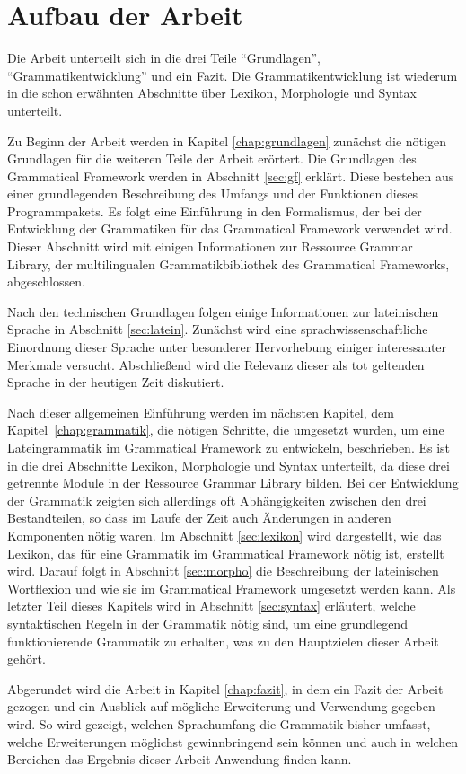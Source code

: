 \section{Aufbau der Arbeit}
\label{sec:aufbau}
Die Arbeit unterteilt sich in die drei Teile "`Grundlagen"', "`Grammatikentwicklung"' und ein Fazit. Die Grammatikentwicklung ist wiederum in die schon erwähnten Abschnitte über Lexikon, Morphologie und Syntax unterteilt. \par
Zu Beginn der Arbeit werden in Kapitel \ref{chap:grundlagen} zunächst die nötigen Grundlagen für die weiteren Teile der Arbeit erörtert. Die Grundlagen des Grammatical Framework werden in Abschnitt \ref{sec:gf} erklärt. Diese bestehen aus einer grundlegenden Beschreibung des Umfangs und der Funktionen dieses Programmpakets. Es folgt eine Einführung in den Formalismus, der bei der Entwicklung der Grammatiken für das Grammatical Framework verwendet wird. Dieser Abschnitt wird mit einigen Informationen zur Ressource Grammar Library, der multilingualen Grammatikbibliothek des Grammatical Frameworks, abgeschlossen. \par
Nach den technischen Grundlagen folgen einige Informationen zur lateinischen Sprache in Abschnitt \ref{sec:latein}. Zunächst wird eine sprachwissenschaftliche Einordnung dieser Sprache unter besonderer Hervorhebung einiger interessanter Merkmale versucht. Abschließend wird die Relevanz dieser als tot geltenden Sprache in der heutigen Zeit diskutiert. \par
Nach dieser allgemeinen Einführung werden im nächsten Kapitel, dem \mbox{Kapitel \ref{chap:grammatik}}, die nötigen Schritte, die umgesetzt wurden, um eine Lateingrammatik im Grammatical Framework zu entwickeln, beschrieben. Es ist in die drei Abschnitte Lexikon, Morphologie und Syntax unterteilt, da diese drei getrennte Module in der Ressource Grammar Library bilden. Bei der Entwicklung der Grammatik zeigten sich allerdings oft Abhängigkeiten zwischen den drei Bestandteilen, so dass im Laufe der Zeit auch Änderungen in anderen Komponenten nötig waren. Im Abschnitt \ref{sec:lexikon} wird dargestellt, wie das Lexikon, das für eine Grammatik im Grammatical Framework nötig ist, erstellt wird. Darauf folgt in Abschnitt \ref{sec:morpho} die Beschreibung der lateinischen Wortflexion und wie sie im Grammatical Framework umgesetzt werden kann. Als letzter Teil dieses Kapitels wird in Abschnitt \ref{sec:syntax} erläutert, welche syntaktischen Regeln in der Grammatik nötig sind, um eine grundlegend funktionierende Grammatik zu erhalten, was zu den Hauptzielen dieser Arbeit gehört. \par
Abgerundet wird die Arbeit in Kapitel \ref{chap:fazit}, in dem ein Fazit der Arbeit gezogen und ein Ausblick auf mögliche Erweiterung und Verwendung gegeben wird. So wird gezeigt, welchen Sprachumfang die Grammatik bisher umfasst, welche Erweiterungen möglichst gewinnbringend sein können und auch in welchen Bereichen das Ergebnis dieser Arbeit Anwendung finden kann.
